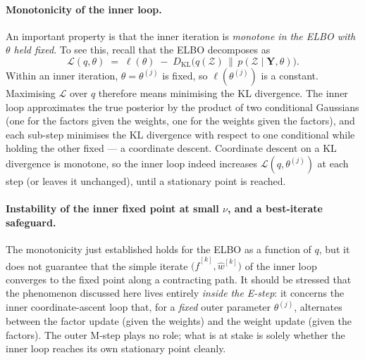 \documentclass[11pt, a4paper, oneside]{article}
\newcommand{\mY}{\mathbf{Y}}
\begin{document}
\paragraph{Monotonicity of the inner loop.}
An important property is that the inner iteration is
\emph{monotone in the ELBO with $\theta$ held fixed}. To see this,
recall that the ELBO decomposes as
\[
\mathcal{L}(q, \theta) \;=\; \ell(\theta) \;-\; D_{\mathrm{KL}}\big(q(\mathcal{Z}) \,\big\|\, p(\mathcal{Z} \mid \mY, \theta)\big).
\]
Within an inner iteration, $\theta = \theta^{(j)}$ is fixed, so
$\ell(\theta^{(j)})$ is a constant. Maximising $\mathcal{L}$ over $q$
therefore means minimising the KL divergence. The inner loop
approximates the true posterior by the product of two conditional
Gaussians (one for the factors given the weights, one for the weights
given the factors), and each sub-step minimises the KL divergence
with respect to one conditional while holding the other fixed — a
coordinate descent. Coordinate descent on a KL divergence is
monotone, so the inner loop indeed increases
$\mathcal{L}(q, \theta^{(j)})$ at each step (or leaves it unchanged),
until a stationary point is reached.

\paragraph{Instability of the inner fixed point at small $\nu$, and a
best-iterate safeguard.}
The monotonicity just established holds for the ELBO as a function of
$q$, but it does not guarantee that the simple iterate
$\big(\hat{f}^{[k]}, \hat{w}^{[k]}\big)$ of the inner loop converges to
the fixed point along a contracting path. It should be stressed that
the phenomenon discussed here lives entirely \emph{inside the E-step}:
it concerns the inner coordinate-ascent loop that, for a \emph{fixed}
outer parameter $\theta^{(j)}$, alternates between the factor update
(given the weights) and the weight update (given the factors). The
outer M-step plays no role; what is at stake is solely whether the
inner loop reaches its own stationary point cleanly.
\end{document}
